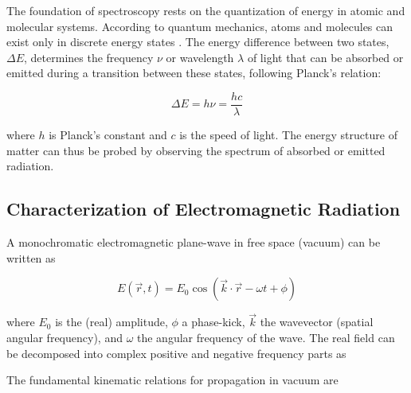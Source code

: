 \noindent The foundation of spectroscopy rests on the quantization of energy in atomic and molecular systems. According to quantum mechanics, atoms and molecules can exist only in discrete energy states \cite{albashetal2012quantumadiabaticmarkovian}. The energy difference between two states, $\Delta E$, determines the frequency $\nu$ or wavelength $\lambda$ of light that can be absorbed or emitted during a transition between these states, following Planck's relation:

\begin{equation}
	\Delta E = h\nu = \frac{hc}{\lambda}
	\label{eq:planck_relation}
\end{equation}

\noindent 
where $h$ is Planck's constant and $c$ is the speed of light. The energy structure of matter can thus be probed by observing the spectrum of absorbed or emitted radiation.


\subsection{Characterization of Electromagnetic Radiation}
\label{subsec:em_radiation_characterization}

\noindent 
A monochromatic electromagnetic plane-wave in free space (vacuum) can be written as

\begin{equation}
	E(\vec{r},t) = E_0 \cos(\vec{k} \cdot \vec{r} - \omega t + \phi)
	\label{eq:plane_wave}
\end{equation}

\noindent 
where $E_0$ is the (real) amplitude, $\phi$ a phase-kick, $\vec{k}$ the wavevector (spatial angular frequency), and $\omega$ the angular frequency of the wave. The real field can be decomposed into complex positive and negative frequency parts as

\iffalse
\begin{equation}
	E^{(+)} = E_0 e^{i(\vec{k} \cdot \vec{r} - \omega t + \phi)}
	\label{eq:positive_frequency_e_field}
\end{equation}

\noindent 
with $E^{(-)} = E^{(+)}^{*}$ and thus $E = 1/2 \{E^{(+)} + E^{(-)}\}$.
$E^{(+)}$ is called the positive-frequency part because in Fourier space it contains only components with frequencies $\omega > 0$ \todoref{fact check}. This will come in handy applying a rotating wave approximation as the positive field part rotates in the same direction as the rotating frame and the negative rotates in the opposite direction \cite{hamm2005principlesnonlinearoptical}.
\fi
\noindent 
The fundamental kinematic relations for propagation in vacuum are

